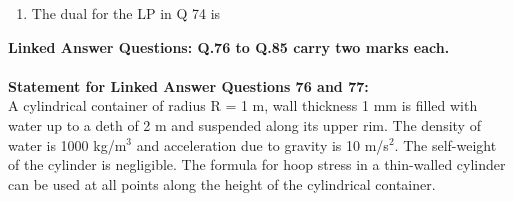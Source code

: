 \documentclass[journal,12pt,onecolumn]{IEEEtran}
\begin{document}
\begin{enumerate}[resume]
    \item The dual for the LP in Q 74 is
          \begin{enumerate}
          \end{enumerate}

\end{enumerate}
\large\textbf{Linked Answer Questions: Q.76 to Q.85 carry two marks each.}\\\\
\normalsize\textbf{Statement for Linked Answer Questions 76 and 77:}\\

A cylindrical container of radius R = 1 m, wall thickness 1 mm is filled with water up to a deth of 2 m and suspended along its upper rim. The density of water is 1000 kg/m$^3$ and acceleration due to gravity is 10 m/s$^2$. The self-weight of the cylinder is negligible. The formula for hoop stress in a thin-walled cylinder can be used at all points along the height of the cylindrical container.
\end{document}
